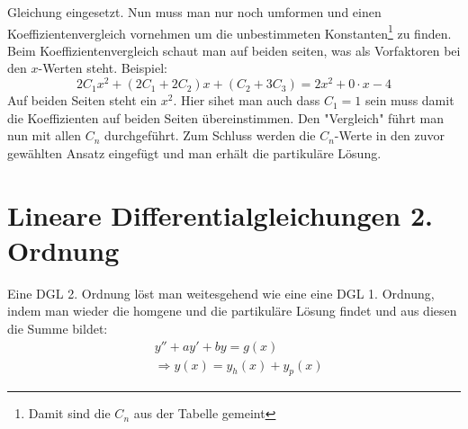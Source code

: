 \documentclass[a4paper,10pt]{scrartcl}
\begin{document}
        Gleichung eingesetzt. Nun muss man nur noch umformen und einen Koeffizientenvergleich vornehmen um die unbestimmeten Konstanten\footnote{Damit sind die \(C_n\) aus der Tabelle gemeint} zu finden. \\
        Beim Koeffizientenvergleich schaut man auf beiden seiten, was als Vorfaktoren bei den \(x\)-Werten steht. Beispiel: 
        \begin{equation*}
            2C_1x^2 + (2C_1 + 2C_2)x + (C_2+ 3C_3) = 2x^2 + 0 \cdot x - 4 
        \end{equation*}
        Auf beiden Seiten steht ein \(x^2\). Hier sihet man auch dass \(C_1 = 1\) sein muss damit die Koeffizienten auf beiden Seiten übereinstimmen. Den "Vergleich" führt man 
        nun mit allen \(C_n\) durchgeführt. Zum Schluss werden die \(C_n\)-Werte in den zuvor gewählten Ansatz eingefügt und man erhält die partikuläre Lösung.  
    \section{Lineare Differentialgleichungen 2. Ordnung}
        Eine DGL 2. Ordnung löst man weitesgehend wie eine eine DGL 1. Ordnung, indem man wieder die homgene und die partikuläre Lösung findet und aus diesen  die Summe bildet:
        \begin{equation}
            \begin{aligned}
                & y'' + ay' + by = g(x) \\
                & \Rightarrow y(x) = y_h(x) + y_p(x) 
            \end{aligned}
        \end{equation}   
\end{document}
